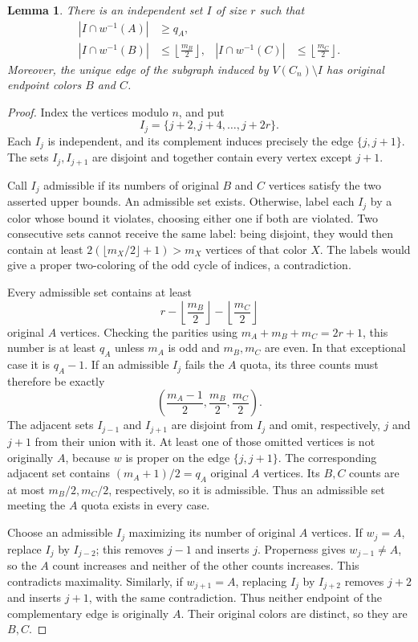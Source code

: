 \documentclass[11pt,reqno]{amsart}
\numberwithin{equation}{section}
\newtheorem{lemma}[theorem]{Lemma}
\theoremstyle{definition}
\theoremstyle{remark}
\begin{document}
\begin{lemma}\label{odd:fair}
There is an independent set $I$ of size $r$ such that
\begin{align*}
|I\cap w^{-1}(A)|&\ge q_A,\\
|I\cap w^{-1}(B)|&\le\left\lfloor\frac{m_B}{2}\right\rfloor,
&
|I\cap w^{-1}(C)|&\le\left\lfloor\frac{m_C}{2}\right\rfloor.
\end{align*}
Moreover, the unique edge of the subgraph induced by $V(C_n)\setminus I$
has original endpoint colors $B$ and $C$.
\end{lemma}
\begin{proof}
Index the vertices modulo $n$, and put
\[
I_j=\{j+2,j+4,\ldots,j+2r\}.
\]
Each $I_j$ is independent, and its complement induces precisely the
edge $\{j,j+1\}$. The sets $I_j,I_{j+1}$ are disjoint and together
contain every vertex except $j+1$.

Call $I_j$ admissible if its numbers of original $B$ and $C$ vertices
satisfy the two asserted upper bounds. An admissible set exists.
Otherwise, label each $I_j$ by a color whose bound it violates,
choosing either one if both are violated. Two consecutive sets cannot
receive the same label: being disjoint, they would then contain at
least $2(\lfloor m_X/2\rfloor+1)>m_X$ vertices of that color $X$.
The labels would give a proper two-coloring of the odd cycle of
indices, a contradiction.

Every admissible set contains at least
\[
r-\left\lfloor\frac{m_B}{2}\right\rfloor
 -\left\lfloor\frac{m_C}{2}\right\rfloor
\]
original $A$ vertices. Checking the parities using
$m_A+m_B+m_C=2r+1$, this number is at least $q_A$ unless
$m_A$ is odd and $m_B,m_C$ are even. In that exceptional case it is
$q_A-1$. If an admissible $I_j$ fails the $A$ quota, its three counts
must therefore be exactly
\[
\left(\frac{m_A-1}{2},\frac{m_B}{2},\frac{m_C}{2}\right).
\]
The adjacent sets $I_{j-1}$ and $I_{j+1}$ are disjoint from $I_j$
and omit, respectively, $j$ and $j+1$ from their union with it.
At least one of those omitted vertices is not originally $A$, because
$w$ is proper on the edge $\{j,j+1\}$. The corresponding adjacent
set contains $(m_A+1)/2=q_A$ original $A$ vertices. Its $B,C$
counts are at most $m_B/2,m_C/2$, respectively, so it is admissible.
Thus an admissible set meeting the $A$ quota exists in every case.

Choose an admissible $I_j$ maximizing its number of original $A$
vertices. If $w_j=A$, replace $I_j$ by $I_{j-2}$; this removes
$j-1$ and inserts $j$. Properness gives $w_{j-1}\ne A$, so the
$A$ count increases and neither of the other counts increases.
This contradicts maximality. Similarly, if $w_{j+1}=A$, replacing
$I_j$ by $I_{j+2}$ removes $j+2$ and inserts $j+1$, with the same
contradiction. Thus neither endpoint of the complementary edge is
originally $A$. Their original colors are distinct, so they are $B,C$.
\end{proof}
\end{document}
